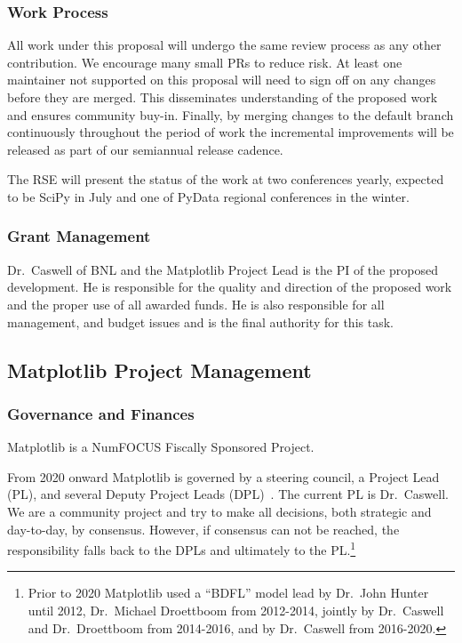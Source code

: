 \documentclass[12pt]{article}
\numberwithin{page}{section}
\begin{document}

\subsubsection{Work Process}

All work under this proposal will undergo the same review process
as any other contribution.  We
encourage many small PRs to reduce risk.  At least one maintainer not
supported on this proposal
will need to sign off on any changes before they are merged. This
disseminates understanding of the proposed work and ensures
community buy-in.  Finally, by merging
changes to the default branch continuously throughout the period of
work the incremental improvements will be released as part of our
semiannual release cadence.

The RSE will present the status of the work at two conferences yearly,
expected to be SciPy in July and one of PyData regional conferences in
the winter.


\subsubsection{Grant Management}

Dr.\ Caswell of BNL and the Matplotlib Project Lead is the PI of the proposed
development.  He is responsible for the quality and direction of the proposed
work and the proper use of all awarded funds.  He is also responsible for all
management, and budget issues and is the final authority for this task.


\subsection{Matplotlib Project Management}
\subsubsection{Governance and Finances}

Matplotlib is a NumFOCUS Fiscally Sponsored Project.

From 2020 onward Matplotlib is governed by a steering council, a Project Lead
(PL), and several Deputy Project Leads (DPL)~\cite{gov}.  The current PL is
Dr.\ Caswell.  We are a community project and try to make all decisions, both
strategic and day-to-day, by consensus.  However, if consensus can not be
reached, the responsibility falls back to the DPLs and ultimately to the
PL.\footnote{Prior to 2020 Matplotlib used a ``BDFL'' model lead by Dr.\ John
Hunter until 2012, Dr.\ Michael Droettboom from 2012-2014, jointly by
Dr.\ Caswell and Dr.\ Droettboom from 2014-2016, and by Dr.\ Caswell from
2016-2020.}
\end{document}
